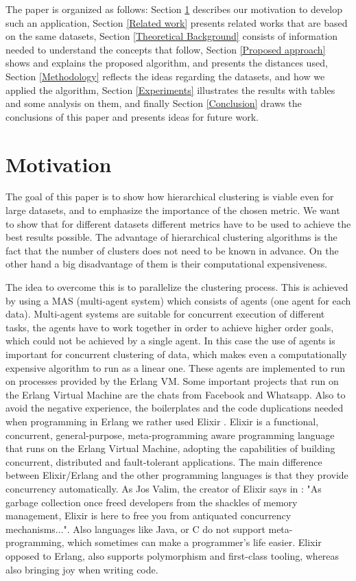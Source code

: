 \documentclass[conference]{IEEEtran}
\begin{document}
The paper is organized as follows: Section \ref{Motivation} describes our motivation to develop such an application, Section \ref{Related work} presents related works that are based on the same datasets, Section \ref{Theoretical Background} consists of information needed to understand the concepts that follow, Section \ref{Proposed approach} shows and explains the proposed algorithm, and presents the distances used, Section \ref{Methodology} reflects the ideas regarding the datasets, and how we applied the algorithm, Section \ref{Experiments} illustrates the results with tables and some analysis on them, and finally Section \ref{Conclusion} draws the conclusions of this paper and presents ideas for future work.


\section{Motivation}
\label{Motivation}

The goal of this paper is to show how hierarchical clustering is viable even for large datasets, and to emphasize the importance of the chosen metric. We want to show that for different datasets different metrics have to be used to achieve the best results possible. The advantage of hierarchical clustering algorithms is the fact that the number of clusters does not need to be known in advance. On the other hand a big disadvantage of them is their computational expensiveness.

The idea to overcome this is to parallelize the clustering process. This is achieved by using a MAS (multi-agent system) \cite{MAS} which consists of agents (one agent for each data). Multi-agent systems are suitable for concurrent execution of different tasks, the agents have to work together in order to achieve higher order goals, which could not be achieved by a single agent. In this case the use of agents is important for concurrent clustering of data, which makes even a computationally expensive algorithm to run as a linear one.
These agents are implemented to run on processes provided by the Erlang \cite{website:erlang} VM. Some important projects that run on the Erlang Virtual Machine are the chats from Facebook and Whatsapp. Also to avoid the negative experience, the boilerplates and the code duplications needed when programming in Erlang we rather used Elixir \cite{website:elixir} \cite{ProgrammingElixir}.
Elixir is a functional, concurrent, general-purpose, meta-programming aware programming language that runs on the Erlang Virtual Machine, adopting the capabilities of building concurrent, distributed and fault-tolerant applications. The main difference between Elixir/Erlang and the other programming languages is that they provide concurrency automatically. As Jos Valim, the creator of Elixir says in \cite{ProgrammingElixir}: "As garbage collection once freed developers from the shackles of memory management, Elixir is here to free you from antiquated concurrency mechanisms...". Also languages like Java, or C do not support meta-programming, which sometimes can make a programmer's life easier. Elixir opposed to Erlang, also supports polymorphism and first-class tooling, whereas also bringing joy when writing code.
\end{document}
